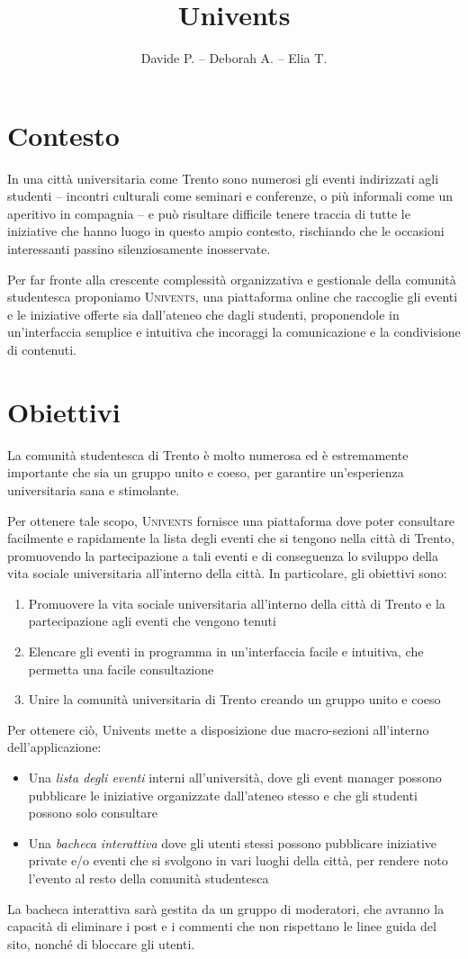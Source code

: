 \documentclass{article}
\title{Univents}
\author{Davide P. -- Deborah A. -- Elia T.}
\date{}
\begin{document}
%
\maketitle
%
\section*{Contesto}
%
In una città universitaria come Trento sono numerosi gli eventi indirizzati agli studenti -- incontri culturali come seminari e conferenze, o più informali come un aperitivo in compagnia -- e può risultare difficile tenere traccia di tutte le iniziative che hanno luogo in questo ampio contesto, rischiando che le occasioni interessanti passino silenziosamente inosservate.

Per far fronte alla crescente complessità organizzativa e gestionale della comunità studentesca proponiamo \textsc{Univents}, una piattaforma online che raccoglie gli eventi e le iniziative offerte sia dall'ateneo che dagli studenti, proponendole in un'interfaccia semplice e intuitiva che incoraggi la comunicazione e la condivisione di contenuti.
%
\section*{Obiettivi}
%
La comunità studentesca di Trento è molto numerosa ed è estremamente importante che sia un gruppo unito e coeso, per garantire un'esperienza universitaria sana e stimolante.

Per ottenere tale scopo, \textsc{Univents} fornisce una piattaforma dove poter consultare facilmente e rapidamente la lista degli eventi che si tengono nella città di Trento, promuovendo la partecipazione a tali eventi e di conseguenza lo sviluppo della vita sociale universitaria all'interno della città. In particolare, gli obiettivi sono:
%
\begin{enumerate}
   \item Promuovere la vita sociale universitaria all'interno della città di Trento e la partecipazione agli eventi che vengono tenuti
   \item Elencare gli eventi in programma in un'interfaccia facile e intuitiva, che permetta una facile consultazione
   \item Unire la comunità universitaria di Trento creando un gruppo unito e coeso
\end{enumerate}
%
Per ottenere ciò, Univents mette a disposizione due macro-sezioni all’interno dell’applicazione:
%
\begin{itemize}
   \item Una \textit{lista degli eventi} interni all’università, dove gli event manager possono pubblicare le iniziative organizzate dall’ateneo stesso e che gli studenti possono solo consultare
   \item Una \textit{bacheca interattiva} dove gli utenti stessi possono pubblicare iniziative private e/o eventi che si svolgono in vari luoghi della città, per rendere noto l’evento al resto della comunità studentesca
\end{itemize}
%
La bacheca interattiva sarà gestita da un gruppo di moderatori, che avranno la capacità di eliminare i post e i commenti che non rispettano le linee guida del sito, nonché di bloccare gli utenti.
\end{document}
